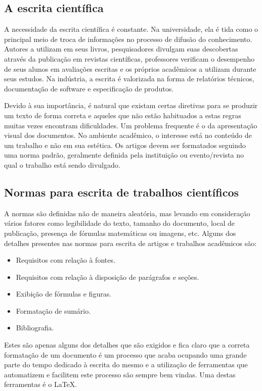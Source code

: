 \subsection{A escrita científica}
A necessidade da escrita científica é constante. Na universidade, ela é tida como o principal meio de troca de informações %
no processo de difusão do conhecimento. Autores a utilizam em seus livros, pesquisadores divulgam suas descobertas através da publicação em revistas científicas, professores verificam o desempenho de seus alunos em avaliações escritas e os próprios acadêmicos a utilizam durante seus estudos. Na indústria, a escrita é valorizada na forma de relatórios técnicos, documentação de software e especificação de produtos.

Devido à sua importância, é natural que existam certas diretivas para se produzir um texto de forma correta e aqueles que não estão habituados a estas regras muitas vezes encontram dificuldades. Um problema frequente é o da apresentação visual dos documentos. No ambiente acadêmico, o interesse está no conteúdo de um trabalho e não em sua estética. Os artigos devem ser formatados seguindo uma norma padrão, geralmente definida pela instituição ou evento/revista no qual o trabalho está sendo divulgado. 

\subsection{Normas para escrita de trabalhos científicos}
A normas são definidas não de maneira aleatória, mas levando em consideração vários fatores como legibilidade do texto, tamanho do documento, local de publicação, presença de fórmulas matemáticas ou imagens, etc. Alguns dos detalhes presentes nas normas para escrita de artigos e trabalhos acadêmicos são:

\begin{itemize}
\item Requisitos com relação à fontes.
\item Requisitos com relação à disposição de parágrafos e seções.
\item Exibição de fórmulas e figuras.
\item Formatação de sumário.
\item Bibliografia.
\end{itemize}

Estes são apenas alguns dos detalhes que são exigidos e fica claro que a correta formatação de um documento é um processo que acaba ocupando uma grande parte do tempo dedicado à escrita do mesmo e a utilização de ferramentas que automatizem e facilitem este processo são sempre bem vindas. Uma destas ferramentas é o \LaTeX.

